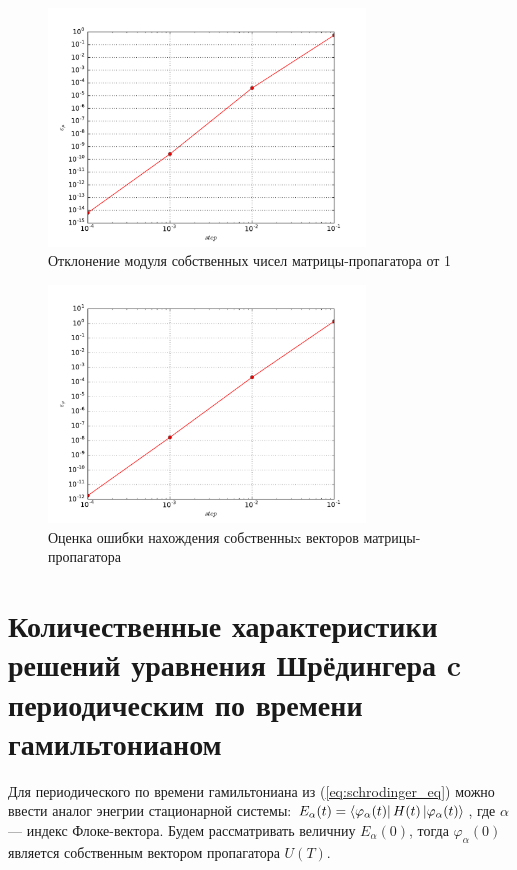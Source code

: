 \documentclass[a4paper]{article}
\begin{document}
\begin{figure}[H]
	\center
	\includegraphics[width=0.75\textwidth]{../pictures/lab5_eigvals_error.pdf}
	\caption{Отклонение модуля собственных чисел матрицы-пропагатора от 1}
	\label{fig:eigvals_error}
\end{figure}

\begin{figure}[H]
	\center
	\includegraphics[width=0.75\textwidth]{../pictures/lab5_eigvecs_error.pdf}
	\caption{Оценка ошибки нахождения собственныx векторов матрицы-пропагатора}
	\label{fig:eigvecs_error}
\end{figure}

\section{Количественные характеристики решений уравнения Шрёдингера c
периодическим по времени гамильтонианом}

Для периодического по времени гамильтониана из (\ref{eq:schrodinger_eq}) можно ввести
аналог энегрии стационарной системы: \(E_\alpha(t)=\bra{\varphi_\alpha(t)}H(t)\ket{\varphi_\alpha(t)}\),
где \(\alpha\) --- индекс Флоке-вектора. Будем рассматривать величниу \(E_\alpha(0)\),
тогда \(\varphi_\alpha(0)\) является собственным вектором пропагатора \(U(T)\).
\end{document}
